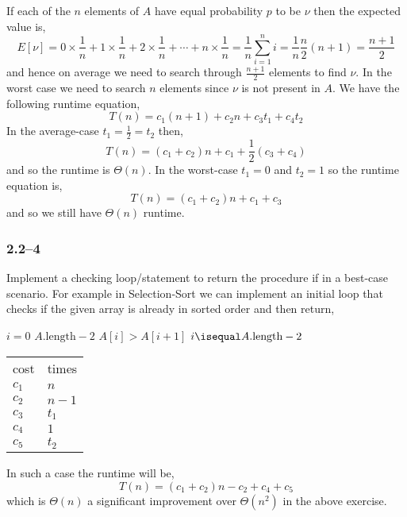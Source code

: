 If each of the $n$ elements of $A$ have equal probability $p$ to be $\nu$ then the expected value is,
\begin{equation*}
	E[\nu] = 0\times\frac{1}{n}+1\times\frac{1}{n} + 2\times\frac{1}{n} + \cdots + n\times\frac{1}{n} = \frac{1}{n}\sum_{i=1}^{n}i = \frac{1}{n}\frac{n}{2}(n+1) = \frac{n+1}{2}
\end{equation*}
and hence on average we need to search through $\frac{n+1}{2}$ elements to find $\nu$. In the worst case we need to search $n$ elements since $\nu$ is not present in $A$. We have the following runtime equation,
\begin{equation*}
	T(n) = c_{1}(n+1) + c_{2}n + c_{3}t_{1} + c_{4}t_{2}
\end{equation*}
In the average-case $t_{1}=\frac{1}{2}=t_{2}$ then,
\begin{equation*}
	T(n) = (c_{1} + c_{2})n + c_{1} + \frac{1}{2}(c_{3} + c_{4})
\end{equation*}
and so the runtime is $\Theta(n)$. In the worst-case $t_{1}=0$ and $t_{2}=1$ so the runtime equation is,
\begin{equation*}
	T(n) = (c_{1} + c_{2})n + c_{1} + c_{3}
\end{equation*}
and so we still have $\Theta(n)$ runtime.

\subsubsection*{2.2--4}

Implement a checking loop/statement to return the procedure if in a best-case scenario. For example in Selection-Sort we can implement an initial loop that checks if the given array is already in sorted order and then return,
\begin{multicols}{2}
	\begin{codebox}
		\Procname{}
		\li \For $i = 0$ \To $A.\text{length}-2$
		\li \Do
					\If $A[i] > A[i+1]$
		\li		\Then
						\Break
					\End
				\End
		\li \If $i \isequal A.\text{length}-2$
		\li \Then
					\Return
				\End
	\end{codebox}
	\begin{tabular}{ l l }
		cost & times\\
		$c_{1}$ & $n$\\
		$c_{2}$ & $n-1$\\
		$c_{3}$ & $t_{1}$\\
		$c_{4}$ & $1$\\
		$c_{5}$ & $t_{2}$
	\end{tabular}
\end{multicols}
In such a case the runtime will be,
\begin{equation*}
	T(n) = (c_{1}+c_{2})n - c_{2} + c_{4} + c_{5}
\end{equation*}
which is $\Theta(n)$ a significant improvement over $\Theta(n^{2})$ in the above exercise.


